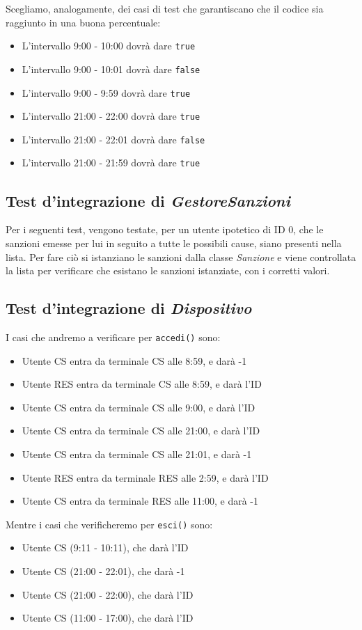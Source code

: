 \documentclass[12pt, letterpaper]{article}
\begin{document}
\noindent
Scegliamo, analogamente, dei casi di test che garantiscano
che il codice sia raggiunto in una buona percentuale:
\begin{itemize}
    \item L'intervallo 9:00 - 10:00 dovrà dare \texttt{true}
    \item L'intervallo 9:00 - 10:01 dovrà dare \texttt{false}
    \item L'intervallo 9:00 - 9:59 dovrà dare \texttt{true}
    \item L'intervallo 21:00 - 22:00 dovrà dare \texttt{true}
    \item L'intervallo 21:00 - 22:01 dovrà dare \texttt{false}
    \item L'intervallo 21:00 - 21:59 dovrà dare \texttt{true}
\end{itemize}

\subsection{Test d'integrazione di \emph{GestoreSanzioni}}
Per i seguenti test, vengono testate, per un utente ipotetico 
di ID 0, che le sanzioni emesse per lui in seguito a tutte 
le possibili cause, siano presenti nella lista.
Per fare ciò si istanziano le sanzioni dalla classe 
\emph{Sanzione} e viene controllata la lista per verificare 
che esistano le sanzioni istanziate, con i corretti valori.

\subsection{Test d'integrazione di \emph{Dispositivo}}
I casi che andremo a verificare per \texttt{accedi()} sono:
\begin{itemize}
    \item Utente CS entra da terminale CS alle 8:59, e darà -1
    \item Utente RES entra da terminale CS alle 8:59, e darà l'ID 
    \item Utente CS entra da terminale CS alle 9:00, e darà l'ID 
    \item Utente CS entra da terminale CS alle 21:00, e darà l'ID 
    \item Utente CS entra da terminale CS alle 21:01, e darà -1
    \item Utente RES entra da terminale RES alle 2:59, e darà l'ID 
    \item Utente CS entra da terminale RES alle 11:00, e darà -1
\end{itemize}

\noindent
Mentre i casi che verificheremo per \texttt{esci()} sono:
\begin{itemize}
    \item Utente CS (9:11 - 10:11), che darà l'ID 
    \item Utente CS (21:00 - 22:01), che darà -1
    \item Utente CS (21:00 - 22:00), che darà l'ID 
    \item Utente CS (11:00 - 17:00), che darà l'ID 
\end{itemize}
\end{document}
